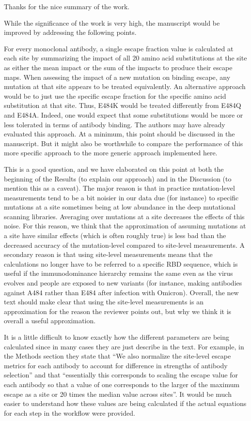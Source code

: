 \documentclass[11pt, oneside]{article}   	%
\newcommand{\response}[1]{{\color{black}#1}}
\begin{document}
\response{Thanks for the nice summary of the work.}

While the significance of the work is very high, the manuscript would be improved by addressing the following points.

For every monoclonal antibody, a single escape fraction value is calculated at each site by summarizing the impact of all 20 amino acid substitutions at the site as either the mean impact or the sum of the impacts to produce their escape maps.  When assessing the impact of a new mutation on binding escape, any mutation at that site appears to be treated equivalently.  An alternative approach would be to just use the specific escape fraction for the specific amino acid substitution at that site.  Thus, E484K would be treated differently from E484Q and E484A.  Indeed, one would expect that some substitutions would be more or less tolerated in terms of antibody binding.  The authors may have already evaluated this approach.  At a minimum, this point should be discussed in the manuscript.  But it might also be worthwhile to compare the performance of this more specific approach to the more generic approach implemented here.

\response{This is a good question, and we have elaborated on this point at both the beginning of the Results (to explain our approach) and in the Discussion (to mention this as a caveat).
The major reason is that in practice mutation-level measurements tend to be a bit noisier in our data due (for instance) to specific mutations at a site sometimes being at low abundance in the deep mutational scanning libraries.
Averaging over mutations at a site decreases the effects of this noise.
For this reason, we think that the approximation of assuming mutations at a site have similar effects (which is often roughly true) is less bad than the decreased accuracy of the mutation-level compared to site-level measurements.
A secondary reason is that using site-level measurements means that the calculations no longer have to be referred to a specific RBD sequence, which is useful if the immunodominance hierarchy remains the same even as the virus evolves and people are exposed to new variants (for instance, making antibodies against A484 rather than E484 after infection with Omicron).
Overall, the new text should make clear that using the site-level measurements is an approximation for the reason the reviewer points out, but why we think it is overall a useful approximation.}

It is a little difficult to know exactly how the different parameters are being calculated since in many cases they are just describe in the text.  For example, in the Methods section they state that “We also normalize the site-level escape metrics for each antibody to account for difference in strengths of antibody selection” and that “essentially this corresponds to scaling the escape value for each antibody so that a value of one corresponds to the larger of the maximum escape as a site or 20 times the median value across sites”.  It would be much easier to understand how these values are being calculated if the actual equations for each step in the workflow were provided.
\end{document}
